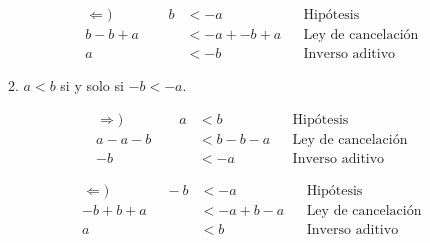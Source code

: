 \documentclass[11pt]{article}
\begin{document}
\begin{enumerate}[label=\alph*)]
\begin{enumerate}[label=\roman*)]
\begin{center}
\begin{minipage}[r]{.5\linewidth}
            \begin{align*}
                \Leftarrow) \qquad \qquad
                b &< -a && \text{Hipótesis}\\
                b -b +a &< -a + -b +a && \text{Ley de cancelación}\\
                a &< -b && \text{Inverso aditivo}
            \end{align*}
        \end{minipage}
        \end{center}
        \item $a<b$ si y solo si $-b<-a$.
        \begin{center}\vspace{-1em}
        \begin{minipage}[l]{.5\linewidth}
            \begin{align*}
                \Rightarrow) \qquad \qquad
                a &< b && \text{Hipótesis}\\
                a -a -b &< b -b -a && \text{Ley de cancelación}\\
                -b &< -a && \text{Inverso aditivo}
            \end{align*}
        \end{minipage}%
        \begin{minipage}[r]{.5\linewidth}
            \begin{align*}
                \Leftarrow) \qquad \qquad
                -b &< -a && \text{Hipótesis}\\
                -b + b +a &< -a +b -a && \text{Ley de cancelación}\\
                a &< b && \text{Inverso aditivo}
            \end{align*}
        \end{minipage}
        \end{center}
    \end{enumerate} %


\end{enumerate}
\end{document}
